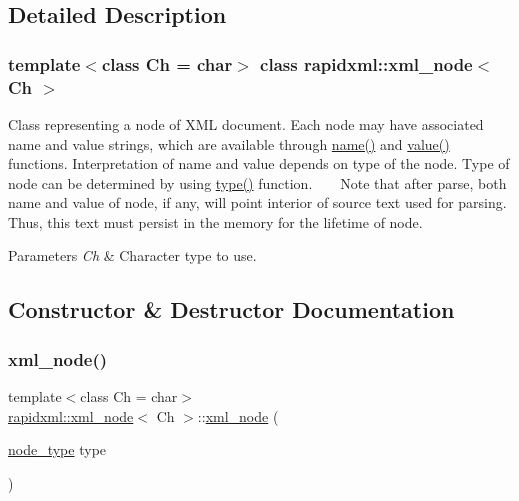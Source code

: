 \subsection{Detailed Description}
\subsubsection*{template$<$class Ch = char$>$\newline
class rapidxml\+::xml\+\_\+node$<$ Ch $>$}

Class representing a node of X\+ML document. Each node may have associated name and value strings, which are available through \hyperlink{classrapidxml_1_1xml__base_aef8ae147fbee59209f714274afc80dc4}{name()} and \hyperlink{classrapidxml_1_1xml__base_a6af65de5e59ac497cd69838f8a89d602}{value()} functions. Interpretation of name and value depends on type of the node. Type of node can be determined by using \hyperlink{classrapidxml_1_1xml__node_a5f91729128856b0aaab598d4364ace60}{type()} function. ~\newline
~\newline
 Note that after parse, both name and value of node, if any, will point interior of source text used for parsing. Thus, this text must persist in the memory for the lifetime of node. 
\begin{DoxyParams}{Parameters}
{\em Ch} & Character type to use. \\
\hline
\end{DoxyParams}


\subsection{Constructor \& Destructor Documentation}
\mbox{\label{classrapidxml_1_1xml__node_a8bd9019960b90605a45998b661fb1b0e}} 
\subsubsection{\texorpdfstring{xml\+\_\+node()}{xml\_node()}}
{\footnotesize\ttfamily template$<$class Ch = char$>$ \\
\hyperlink{classrapidxml_1_1xml__node}{rapidxml\+::xml\+\_\+node}$<$ Ch $>$\+::\hyperlink{classrapidxml_1_1xml__node}{xml\+\_\+node} (\begin{DoxyParamCaption}\item[{\hyperlink{rapidxml_8hpp_abb456db38f7efb746c4330eed6072a7c}{node\+\_\+type}}]{type }\end{DoxyParamCaption})\hspace{0.3cm}{\ttfamily [inline]}}

